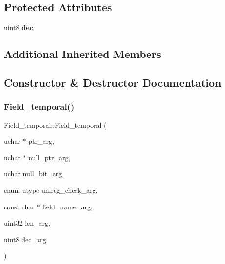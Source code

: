 \subsection*{Protected Attributes}
\begin{DoxyCompactItemize}
\item 
\mbox{\label{classField__temporal_ad7952f00dbd7bfc72f1968e66e6b1b58}} 
uint8 {\bfseries dec}
\end{DoxyCompactItemize}
\subsection*{Additional Inherited Members}


\subsection{Constructor \& Destructor Documentation}
\mbox{\label{classField__temporal_a2c22c4b8db86b16bffd9bb5a941b9455}} 
\subsubsection{\texorpdfstring{Field\+\_\+temporal()}{Field\_temporal()}\hspace{0.1cm}{\footnotesize\ttfamily [1/2]}}
{\footnotesize\ttfamily Field\+\_\+temporal\+::\+Field\+\_\+temporal (\begin{DoxyParamCaption}\item[{uchar $\ast$}]{ptr\+\_\+arg,  }\item[{uchar $\ast$}]{null\+\_\+ptr\+\_\+arg,  }\item[{uchar}]{null\+\_\+bit\+\_\+arg,  }\item[{enum utype}]{unireg\+\_\+check\+\_\+arg,  }\item[{const char $\ast$}]{field\+\_\+name\+\_\+arg,  }\item[{uint32}]{len\+\_\+arg,  }\item[{uint8}]{dec\+\_\+arg }\end{DoxyParamCaption})\hspace{0.3cm}{\ttfamily [inline]}}

